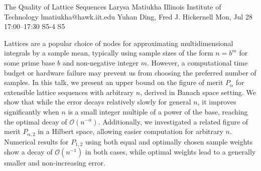 \documentclass[12pt,lettersize,oneside]{book} %
\begin{document}
\begin{talk}
  {The Quality of Lattice Sequences}%
  {Larysa Matiukha}%
  {Illinois Institute of Technology}%
  {lmatiukha@hawk.iit.edu}%
  {Yuhan Ding, Fred J. Hickernell}%
  {}%
  {Mon, Jul 28 17:00--17:30}%
  {S5-4}%
  {S5}%
  
    

Lattices are a popular choice of nodes for approximating multidimensional integrals by a sample mean, typically using sample sizes of the form $n = b^m$ for some prime base $b$ and non-negative integer $m$. However, a computational time budget or hardware failure may prevent us from choosing the preferred number of samples. In this talk, we present an upper bound on the figure of merit $P_\alpha$ for extensible lattice sequences with arbitrary $n$, derived in Banach space setting. We show that while the error decays relatively slowly for general $n$, it improves significantly when $n$ is a small integer multiple of a power of the base, reaching the optimal decay of $\mathcal{O}(n^{-\alpha})$. %
Additionally, we investigated a related figure of merit $P_{\alpha,2}$ in a Hilbert space, allowing easier computation for arbitrary $n$. Numerical results for $P_{1,2}$ using both equal and optimally chosen sample weights show a decay of $\mathcal{O}(n^{-1})$ in both cases, while optimal weights lead to a generally smaller and non-increasing error. 





\end{talk}
\end{document}
